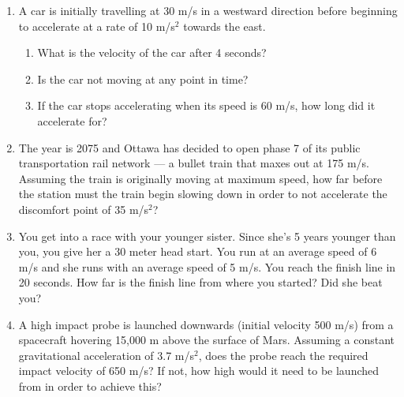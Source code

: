 \documentclass[fleqn]{article}
\begin{document}
\ExamNameLine
\begin{enumerate}
   \item A car is initially travelling at 30 m/s in a westward direction before beginning to accelerate at a rate of 10 m/s$^2$ towards the east.  
      \begin{enumerate}
	 \item What is the velocity of the car after 4 seconds?
	 
	 \answer
	 \item Is the car not moving at any point in time?
	 
	 \answer
	 
	 \item If the car stops accelerating when its speed is 60 m/s, how long did it accelerate for?
	 \answer
      \end{enumerate}
   \item The year is 2075 and Ottawa has decided to open phase 7 of its public transportation rail network --- a bullet train that maxes out at 175 m/s. Assuming the train is originally moving at maximum speed, how far before the station must the train begin slowing down in order to not accelerate  the discomfort point of 35 m/s$^2$?
   \noanswer[2in]
      \newpage
      
   \item You get into a race with your younger sister. Since she's 5 years younger than you, you give her a 30 meter head start. You run at an average speed of 6 m/s and she runs with an average speed of 5 m/s. You reach the finish line in 20 seconds. How far is the finish line from where you started? Did she beat you? 
     \noanswer[3cm]
      \answer
   \item A high impact probe is launched downwards (initial velocity 500 m/s) from a spacecraft hovering 15,000 m above the surface of Mars. Assuming a constant gravitational acceleration of 3.7 m/s$^2$, does the probe reach the required impact velocity of 650 m/s? If not, how high would it need to be launched from in order to achieve this?
     \noanswer[6cm]
      \answer
      \noanswer[0.5cm]
\end{enumerate}
\end{document}

